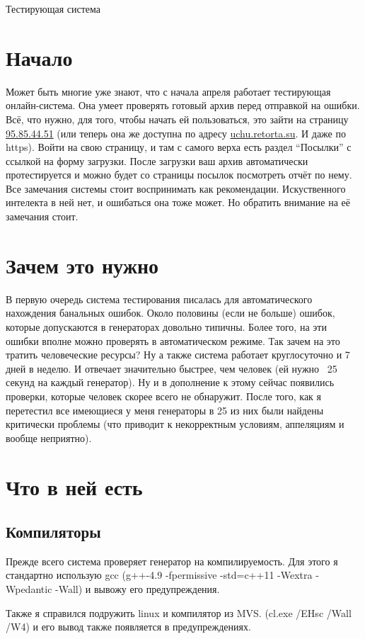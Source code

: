 \documentclass[a4paper,12pt,DIV15]{article}
\theoremstyle{definition}
\theoremstyle{plain}
\theoremstyle{remark}
\begin{document}
\begin{center}
\LARGE{Тестирующая система}
\end{center}
\section{Начало}
Может быть многие уже знают, что с начала апреля работает тестирующая онлайн-система. Она умеет проверять готовый архив перед отправкой на ошибки. Всё, что нужно, для того, 
чтобы начать ей пользоваться, это зайти на страницу \href{http://95.85.44.51}{95.85.44.51} (или теперь она же доступна по адресу \href{https://uchu.retorta.su}{uchu.retorta.su}. И даже по https). Войти на свою страницу,
 и там с самого верха есть раздел ``Посылки'' с ссылкой на форму загрузки. После загрузки ваш архив автоматически протестируется и можно будет со страницы посылок посмотреть отчёт по нему. Все замечания системы стоит 
 воспринимать как рекомендации. Искуственного интелекта в ней нет, и ошибаться она тоже может. Но обратить внимание на её замечания стоит.
\section{Зачем это нужно}
В первую очередь система тестирования писалась для автоматического нахождения банальных ошибок. Около половины (если не больше) ошибок, которые допускаются в генераторах довольно типичны. 
Более того, на эти ошибки вполне можно проверять в автоматическом режиме. Так зачем на это тратить человеческие ресурсы? Ну а также система работает круглосуточно и 7 дней в неделю. И отвечает значительно быстрее, 
чем человек (ей нужно ~25 секунд на каждый генератор). Ну и в дополнение к этому сейчас появились проверки, которые человек скорее всего не обнаружит. После того, как я перетестил все имеющиеся у меня генераторы в 25 
из них были найдены критически проблемы (что приводит к некорректным условиям, аппеляциям и вообще неприятно). 
\section{Что в ней есть}
\subsection{Компиляторы}
Прежде всего система проверяет генератор на компилируемость. Для этого я стандартно использую gcc (g++-4.9 -fpermissive -std=c++11 -Wextra -Wpedantic -Wall) и вывожу его предупреждения. \par
Также я справился подружить linux и компилятор из MVS. (cl.exe  /EHsc /Wall /W4) и его вывод также появляется в предупреждениях.
\end{document}

